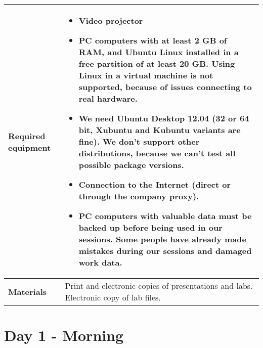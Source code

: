 \documentclass[a4paper,12pt,obeyspaces,spaces,hyphens]{article}
\begin{document}
{\begin{tabularx}{\textwidth}{|g|h|}
    {\bf Required equipment} &
    \begin{itemize}
    \item Video projector
    \item PC computers with at least 2 GB of RAM, and Ubuntu Linux
    installed in a {\bf free partition of at least 20 GB. Using Linux
      in a virtual machine is not supported}, because of issues
    connecting to real hardware.
    \item We need Ubuntu Desktop 12.04 (32 or 64 bit, Xubuntu and
    Kubuntu variants are fine). We don't support other
    distributions, because we can't test all possible package versions.
    \item {\bf Connection to the Internet} (direct or through the
    company proxy).
    \item {\bf PC computers with valuable data must be backed up}
    before being used in our sessions.  Some people have already made
    mistakes during our sessions and damaged work data.
    \end{itemize} \\
    \hline

    {\bf Materials} & Print and electronic copies of presentations and
    labs.
    \newline Electronic copy of lab files.\\
    \hline

\end{tabularx}}
\normalsize


\section{Day 1 - Morning}
\end{document}
